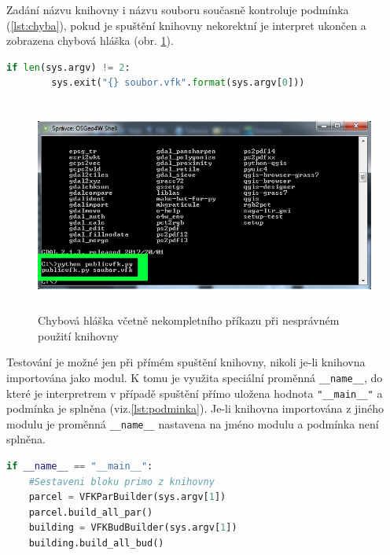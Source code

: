 Zadání názvu knihovny i názvu  souboru současně kontroluje
podmínka (\ref{lst:chyba}), pokud je spuštění knihovny nekorektní je
interpret ukončen a zobrazena chybová hláška
(obr. \ref{fig:testovani_hlaska}).
\begin{lstlisting}[caption=Podmínka pro spouštěcí příkaz, language=Python, label=lst:chyba, numbers=none]
    if len(sys.argv) != 2:
        sys.exit("{} soubor.vfk".format(sys.argv[0]))
\end{lstlisting}

\begin{figure}[H]
	 \centering
      \includegraphics[height=7cm]{./pictures/testovani_hlaska.png}
      \caption{Chybová hláška včetně nekompletního příkazu při nesprávném použití knihovny}
      \label{fig:testovani_hlaska}
  \end{figure}

Testování je možné jen při přímém spuštění knihovny, nikoli je-li
knihovna importována jako modul. K tomu je využita speciální proměnná
\verb|__name__|, do které je interpretrem v případě spuštění přímo
uložena hodnota \verb|"__main__"| a podmínka je
splněna (viz.\ref{lst:podminka}). Je-li knihovna importována z jiného
modulu je proměnná \verb|__name__| nastavena na jméno modulu a
podmínka není splněna.
\begin{lstlisting}[caption=Ukázka sestavení bloků provedeném jen při přímém spuštění knihovny, language=Python, numbers=none, label=lst:podminka]
if __name__ == "__main__":
	#Sestaveni bloku primo z knihovny
    parcel = VFKParBuilder(sys.argv[1])
    parcel.build_all_par()
    building = VFKBudBuilder(sys.argv[1])
    building.build_all_bud()
\end{lstlisting}
